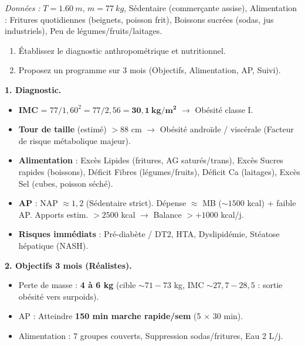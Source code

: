 \documentclass[11pt]{article}
\newcommand{\cle}[1]{{\popxbold\color{popdark}#1}}
\begin{document}
\begin{exoresolu}
\textit{Données :} $T = \SI{1,60}{m}$, $m = \SI{77}{kg}$, Sédentaire (commerçante assise), Alimentation : Fritures quotidiennes (beignets, poisson frit), Boissons sucrées (sodas, jus industriels), Peu de légumes/fruits/laitages.
\begin{enumerate}
\item Établissez le diagnostic anthropométrique et nutritionnel.
\item Proposez un programme sur 3 mois (Objectifs, Alimentation, AP, Suivi).
\end{enumerate}
\tcblower
\textbf{1. Diagnostic.}
\begin{itemize}
\item \textbf{IMC} = $77 / 1,60^2 = 77 / 2,56 = \mathbf{30,1\ kg/m^2}$ $\rightarrow$ \cle{Obésité classe I}.
\item \textbf{Tour de taille} (estimé) $> 88$ cm $\rightarrow$ \cle{Obésité androïde / viscérale} (Facteur de risque métabolique majeur).
\item \textbf{Alimentation} : Excès Lipides (fritures, AG saturés/trans), Excès Sucres rapides (boissons), Déficit Fibres (légumes/fruits), Déficit Ca (laitages), Excès Sel (cubes, poisson séché).
\item \textbf{AP} : NAP $\approx 1,2$ (Sédentaire strict). Dépense $\approx$ MB ($\sim 1500$ kcal) + faible AP. Apports estim. $> 2500$ kcal $\rightarrow$ Balance $> +1000$ kcal/j.
\item \textbf{Risques immédiats} : Pré-diabète / DT2, HTA, Dyslipidémie, Stéatose hépatique (NASH).
\end{itemize}

\textbf{2. Objectifs 3 mois (Réalistes).}
\begin{itemize}
\item Perte de masse : \textbf{4 à 6 kg} (cible $\sim 71-73$ kg, IMC $\sim 27,7-28,5$ : sortie obésité vers surpoids).
\item AP : Atteindre \textbf{150 min marche rapide/sem} (5 $\times$ 30 min).
\item Alimentation : 7 groupes couverts, Suppression sodas/fritures, Eau 2 L/j.
\end{itemize}


\end{exoresolu}
\end{document}
